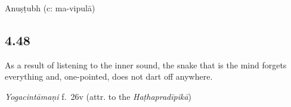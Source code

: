 \begin{ekdosis}
\begin{philcomm}[hp04_047_1]


\end{philcomm}

\begin{metre}[hp04_047_1]
Anuṣṭubh (c: ma-vipulā)
\end{metre}

\subsection*{4.48}
\begin{translation}[hp04_048]
As a result of listening to the inner sound, the snake that is the mind forgets everything and, one-pointed, does not dart off anywhere.
\end{translation}



\begin{testimonia}[hp04_048]
\emph{Yogacintāmaṇi} f.~26v (attr. to the \emph{Haṭhapradīpikā})
\begin{versinnote}
\end{versinnote}


\end{testimonia}
\end{ekdosis}
